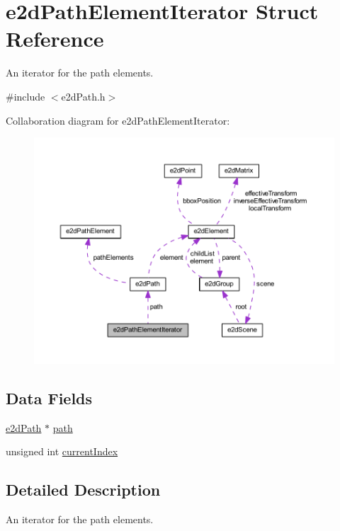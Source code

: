 \hypertarget{structe2dPathElementIterator}{\section{e2d\-Path\-Element\-Iterator Struct Reference}
\label{structe2dPathElementIterator}
}


An iterator for the path elements.  




{\ttfamily \#include $<$e2d\-Path.\-h$>$}



Collaboration diagram for e2d\-Path\-Element\-Iterator\-:\nopagebreak
\begin{figure}[H]
\begin{center}
\leavevmode
\includegraphics[width=350pt]{structe2dPathElementIterator__coll__graph}
\end{center}
\end{figure}
\subsection*{Data Fields}
\begin{DoxyCompactItemize}
\item 
\hyperlink{structe2dPath}{e2d\-Path} $\ast$ \hyperlink{structe2dPathElementIterator_a318773d3a24970f193ecb5e2fcdce1a7}{path}
\item 
unsigned int \hyperlink{structe2dPathElementIterator_a932f59c8e81a171eb21af8d204d1c13d}{current\-Index}
\end{DoxyCompactItemize}


\subsection{Detailed Description}
An iterator for the path elements. 

